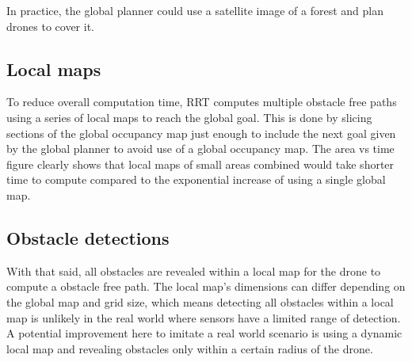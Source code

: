 In practice, the global planner could use a satellite image of a forest and plan drones to cover it. 


\subsection{Local maps}

To reduce overall computation time, RRT computes multiple obstacle free paths
using a series of local maps to reach the global goal. This is done by slicing sections of the global occupancy map just enough to include the next goal given by the global planner to avoid use of a global occupancy map. The area vs time figure clearly shows that local maps of small areas combined would take shorter time to compute compared to the exponential increase of using a single global map.

\subsection{Obstacle detections}
With that said, all obstacles are revealed within a local map for the drone to compute a obstacle free path. The local map's dimensions can differ depending on the global map and grid size, which means detecting all obstacles within a local map is unlikely in the real world where sensors have a limited range of detection. \\
 A potential improvement here to imitate a real world scenario is using a dynamic local map and revealing obstacles only within a certain radius of the drone.

